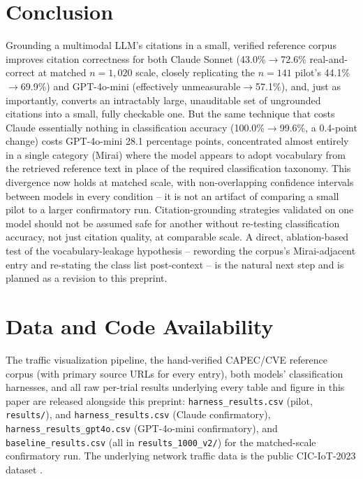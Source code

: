 \documentclass[11pt]{article}
\begin{document}
\section{Conclusion}

Grounding a multimodal LLM's citations in a small, verified reference corpus improves citation
correctness for both Claude Sonnet (43.0\%$\to$72.6\% real-and-correct at matched $n=1{,}020$
scale, closely replicating the $n=141$ pilot's 44.1\%$\to$69.9\%) and GPT-4o-mini (effectively
unmeasurable$\to$57.1\%), and, just as importantly, converts an intractably large, unauditable set
of ungrounded citations into a small, fully checkable one. But the same technique that costs
Claude essentially nothing in classification accuracy (100.0\%$\to$99.6\%, a 0.4-point change)
costs GPT-4o-mini 28.1 percentage points, concentrated almost entirely in a single category
(Mirai) where the model appears to adopt vocabulary from the retrieved reference text in place of
the required classification taxonomy. This divergence now holds at matched scale, with
non-overlapping confidence intervals between models in every condition -- it is not an artifact of
comparing a small pilot to a larger confirmatory run. Citation-grounding strategies validated on
one model should not be assumed safe for another without re-testing classification accuracy, not
just citation quality, at comparable scale. A direct, ablation-based test of the
vocabulary-leakage hypothesis -- rewording the corpus's Mirai-adjacent entry and re-stating the
class list post-context -- is the natural next step and is planned as a revision to this
preprint.

\section*{Data and Code Availability}

The traffic visualization pipeline, the hand-verified CAPEC/CVE reference corpus (with primary
source URLs for every entry), both models' classification harnesses, and all raw per-trial
results underlying every table and figure in this paper are released alongside this preprint:
\texttt{harness\_results.csv} (pilot, \texttt{results/}), and \texttt{harness\_results.csv}
(Claude confirmatory), \texttt{harness\_results\_gpt4o.csv} (GPT-4o-mini confirmatory), and
\texttt{baseline\_results.csv} (all in \texttt{results\_1000\_v2/}) for the matched-scale
confirmatory run. The underlying network traffic data is the public CIC-IoT-2023 dataset
\cite{cic-iot-2023}.
\end{document}
